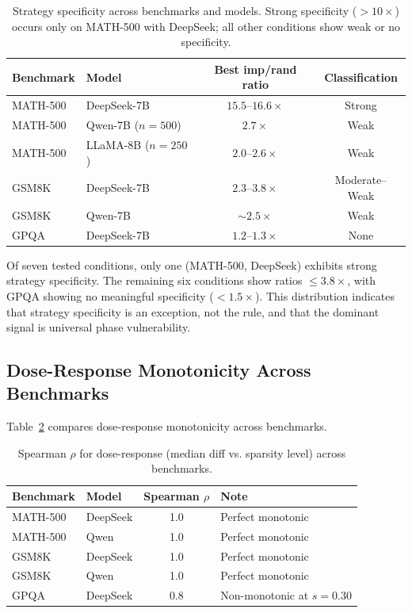 \documentclass[11pt,a4paper]{article}
\begin{document}
\begin{table}[h]
\centering
\caption{Strategy specificity across benchmarks and models. Strong specificity ($>10\times$) occurs only on MATH-500 with DeepSeek; all other conditions show weak or no specificity.}
\label{tab:cross_benchmark}
\small
\begin{tabular}{llcc}
\toprule
Benchmark & Model & Best imp/rand ratio & Classification \\
\midrule
MATH-500 & DeepSeek-7B & $15.5$--$16.6\times$ & Strong \\
MATH-500 & Qwen-7B ($n=500$) & $2.7\times$ & Weak \\
MATH-500 & LLaMA-8B ($n=250$) & $2.0$--$2.6\times$ & Weak \\
GSM8K & DeepSeek-7B & $2.3$--$3.8\times$ & Moderate--Weak \\
GSM8K & Qwen-7B & $\sim 2.5\times$ & Weak \\
GPQA & DeepSeek-7B & $1.2$--$1.3\times$ & None \\
\bottomrule
\end{tabular}
\end{table}

Of seven tested conditions, only one (MATH-500, DeepSeek) exhibits strong strategy specificity. The remaining six conditions show ratios $\leq 3.8\times$, with GPQA showing no meaningful specificity ($<1.5\times$). This distribution indicates that strategy specificity is an exception, not the rule, and that the dominant signal is universal phase vulnerability.

\subsection{Dose-Response Monotonicity Across Benchmarks}

Table~\ref{tab:spearman} compares dose-response monotonicity across benchmarks.

\begin{table}[h]
\centering
\caption{Spearman $\rho$ for dose-response (median diff vs. sparsity level) across benchmarks.}
\label{tab:spearman}
\small
\begin{tabular}{llcl}
\toprule
Benchmark & Model & Spearman $\rho$ & Note \\
\midrule
MATH-500 & DeepSeek & 1.0 & Perfect monotonic \\
MATH-500 & Qwen & 1.0 & Perfect monotonic \\
GSM8K & DeepSeek & 1.0 & Perfect monotonic \\
GSM8K & Qwen & 1.0 & Perfect monotonic \\
GPQA & DeepSeek & 0.8 & Non-monotonic at $s=0.30$ \\
\bottomrule
\end{tabular}
\end{table}
\end{document}
